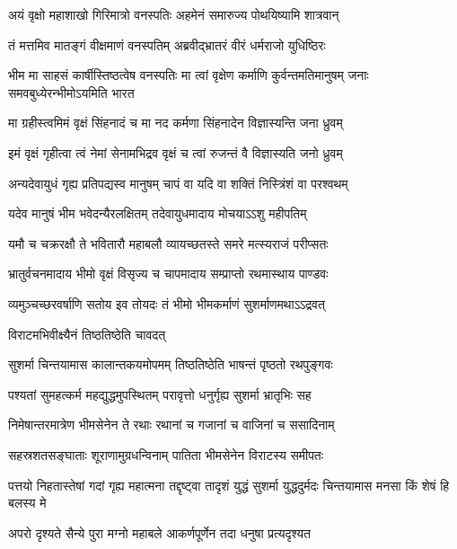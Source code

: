\twolineshloka
{अयं वृक्षो महाशाखो गिरिमात्रो वनस्पतिः}
{अहमेनं समारुज्य पोथयिष्यामि शात्रवान्}



\twolineshloka
{तं मत्तमिव मातङ्गं वीक्षमाणं वनस्पतिम्}
{अब्रवीद्भ्रातरं वीरं धर्मराजो युधिष्ठिरः}


\onelineshloka
{भीम मा साहसं कार्षीस्तिष्ठत्वेष वनस्पतिः}
\twolineshloka
{मा त्वां वृक्षेण कर्माणि कुर्वन्तमतिमानुषम्}
{जनाः समवबुध्येरन्भीमोऽयमिति भारत}


\twolineshloka
{मा ग्रहीस्त्वमिमं वृक्षं सिंहनादं च मा नद}
{कर्मणा सिंहनादेन विज्ञास्यन्ति जना ध्रुवम्}


\twolineshloka
{इमं वृक्षं गृहीत्वा त्वं नेमां सेनामभिद्रव}
{वृक्षं च त्वां रुजन्तं वै विज्ञास्यति जनो ध्रुवम्}


\twolineshloka
{अन्यदेवायुधं गृह्य प्रतिपद्यस्व मानुषम्}
{चापं वा यदि वा शक्तिं निस्त्रिंशं वा परश्वथम्}


\twolineshloka
{यदेव मानुषं भीम भवेदन्यैरलक्षितम्}
{तदेवायुधमादाय मोचयाऽऽशु महीपतिम्}


\twolineshloka
{यमौ च चक्ररक्षौ ते भवितारौ महाबलौ}
{व्यायच्छतस्ते समरे मत्स्यराजं परीप्सतः}



\twolineshloka
{भ्रातुर्वचनमादाय भीमो वृक्षं विसृज्य च}
{चापमादाय सम्प्राप्तो रथमास्थाय पाण्डवः}


\twolineshloka
{व्यमुञ्चच्छरवर्षाणि सतोय इव तोयदः}
{तं भीमो भीमकर्माणं सुशर्माणमथाऽऽद्रवत्}


\onelineshloka
{विराटमभिवीक्ष्यैनं तिष्ठतिष्ठेति चावदत्}


\twolineshloka
{सुशर्मा चिन्तयामास कालान्तकयमोपमम्}
{तिष्ठतिष्ठेति भाषन्तं पृष्ठतो रथपुङ्गवः}


\twolineshloka
{पश्यतां सुमहत्कर्म महद्युद्धमुपस्थितम्}
{परावृत्तो धनुर्गृह्य सुशर्मा भ्रातृभिः सह}


\twolineshloka
{निमेषान्तरमात्रेण भीमसेनेन ते रथाः}
{रथानां च गजानां च वाजिनां च ससादिनाम्}


\twolineshloka
{सहस्रशतसङ्घाताः शूराणामुग्रधन्विनाम्}
{पातिता भीमसेनेन विराटस्य समीपतः}


\onelineshloka
{पत्तयो निहतास्तेषां गदां गृह्य महात्मना}
\twolineshloka
{तद्दृष्ट्वा तादृशं युद्धं सुशर्मा युद्धदुर्मदः}
{चिन्तयामास मनसा किं शेषं हि बलस्य मे}


\twolineshloka
{अपरो दृश्यते सैन्ये पुरा मग्नो महाबले}
{आकर्णपूर्णेन तदा धनुषा प्रत्यदृश्यत}


